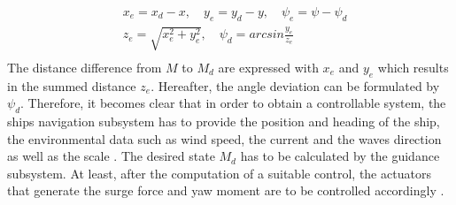   \begin{equation}
  \begin{aligned} 
  \label{eq_ControlObj}
  & x_e= x_d-x, \quad y_e=y_d-y, \quad \psi_e=\psi-\psi_d \\ 
  & z_e= \sqrt{x_e^2+y_e^2}, \quad \psi_d=arcsin\frac{y_e}{z_e}\\
  \end{aligned}
  \end{equation}
	The distance difference from $M$ to $M_d$ are expressed with $x_e$ and $y_e$ which results in the summed distance $z_e$. Hereafter, the angle deviation can be formulated by $\psi_d$. Therefore, it becomes clear that in order to obtain a controllable system, the ships navigation subsystem has to provide the position and heading of the ship, the environmental data such as wind speed, the current and the waves direction as well as the scale \cite{ControlPara}. The desired state $M_d$ has to be calculated by the guidance subsystem. At least, after the computation of a suitable control, the actuators that generate the surge force and yaw moment are to be controlled accordingly \cite{ControlUnder}. 

